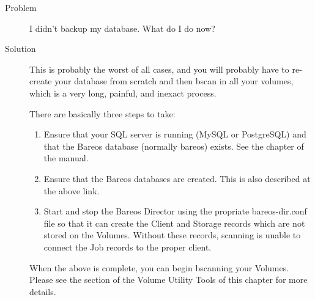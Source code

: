 \begin{description}
\item[Problem]
  I didn't backup my database. What do I do now?
\item[Solution]
  This is probably the worst of all cases, and you will probably have
  to re-create your database from scratch and then bscan in all your
  volumes, which is a very long, painful, and inexact process.

There are basically three steps to take:

\begin{enumerate}
\item Ensure that your SQL server is running (MySQL or PostgreSQL)
   and that the Bareos database (normally bareos) exists.  See the
    chapter of the manual.
\item Ensure that the Bareos databases are created. This is also
   described at the above link.
\item Start and stop the Bareos Director using the propriate
   bareos-dir.conf file so that it can create the Client and
   Storage records which are not stored on the Volumes.  Without these
   records, scanning is unable to connect the Job records to the proper
  client.
\end{enumerate}

When the above is complete, you can begin bscanning your Volumes. Please
see the  section of the Volume Utility Tools of this
chapter for more details.

\end{description}


